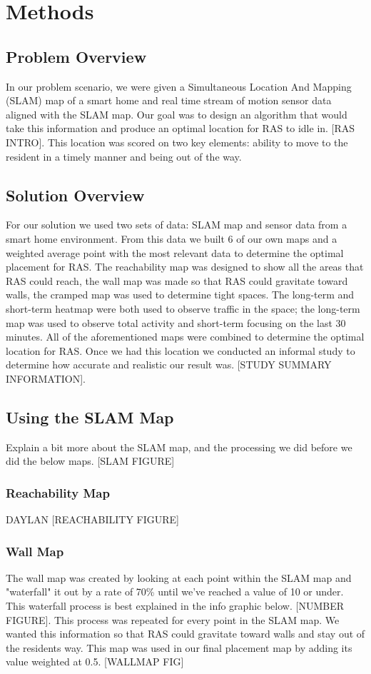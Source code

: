 \documentclass[11pt, draft, a4paper]{IEEEtran}
\begin{document}
\section{Methods}


\subsection{Problem Overview}
In our problem scenario, we were given a Simultaneous Location And Mapping (SLAM) map of a smart home and real time stream of motion sensor data aligned with the SLAM map. Our goal was to design an algorithm that would  take this information and produce an optimal location for RAS to idle in. [RAS INTRO]. This location was scored on two key elements: ability to move to the resident in a timely manner and being out of the way. 


\subsection{Solution Overview}
For our solution we used two sets of data: SLAM map and sensor data from a smart home environment. From this data we built 6 of our own maps and a weighted average point with the most relevant data to determine the optimal placement for RAS. The reachability map was designed to show all the areas that RAS could reach, the wall map was made so that RAS could gravitate toward walls, the cramped map was used to determine tight spaces. The long-term and short-term heatmap were both used to observe traffic in the space; the long-term map was used to observe total activity and short-term focusing on the last 30 minutes. All of the aforementioned maps were combined to determine the optimal location for RAS. Once we had this location we conducted an informal study to determine how accurate and realistic our result was. [STUDY SUMMARY INFORMATION].


\subsection{Using the SLAM Map}
Explain a bit more about the SLAM map, and the processing we did before we did the below maps.
[SLAM FIGURE]

\subsubsection{Reachability Map}
DAYLAN
[REACHABILITY FIGURE]


\subsubsection{Wall Map}
The wall map was created by looking at each point within the SLAM map and "waterfall" it out by a rate of 70\% until we've reached a value of 10 or under. This waterfall process is best explained in the info graphic below. [NUMBER FIGURE]. This process was repeated for every point in the SLAM map. We wanted this information so that RAS could gravitate toward walls and stay out of the residents way. This map was used in our final placement map by adding its value weighted at 0.5. [WALLMAP FIG]
\end{document}
